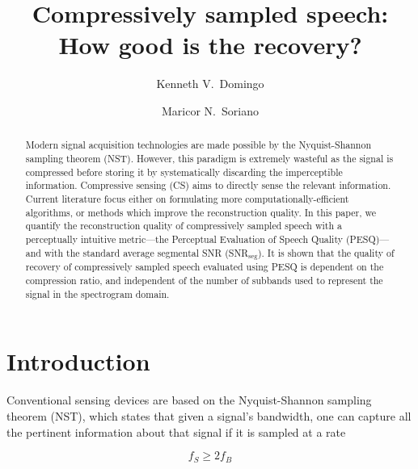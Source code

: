\documentclass[10pt,a4paper,twoside]{article}
\newcommand{\snrseg}{SNR$_{\mathrm{seg}}$}
\begin{document}
\title{\TitleFont Compressively sampled speech: How good is the recovery?}

\author[*\negthickspace]{Kenneth V.~Domingo}
\author[ ]{Maricor N.~Soriano
\lastauthorsep}


\begin{abstract}
\noindent
Modern signal acquisition technologies are made possible by the Nyquist-Shannon sampling theorem (NST). However, this paradigm is extremely wasteful as the signal is compressed before storing it by systematically discarding the imperceptible information. Compressive sensing (CS) aims to directly sense the relevant information. Current literature focus either on formulating more computationally-efficient algorithms, or methods which improve the reconstruction quality. In this paper, we quantify the reconstruction quality of compressively sampled speech with a perceptually intuitive metric---the Perceptual Evaluation of Speech Quality (PESQ)---and with the standard average segmental SNR (\snrseg). It is shown that the quality of recovery of compressively sampled speech evaluated using PESQ is dependent on the compression ratio, and independent of the number of subbands used to represent the signal in the spectrogram domain.


\end{abstract}

\maketitle
\thispagestyle{titlestyle}

\section{Introduction}\label{sec:intro}
Conventional sensing devices are based on the Nyquist-Shannon sampling theorem (NST), which states that given a signal's bandwidth, one can capture all the pertinent information about that signal if it is sampled at a rate

\begin{equation} \label{eq:nst}
	f_S \geq 2f_B
\end{equation}
\end{document}
